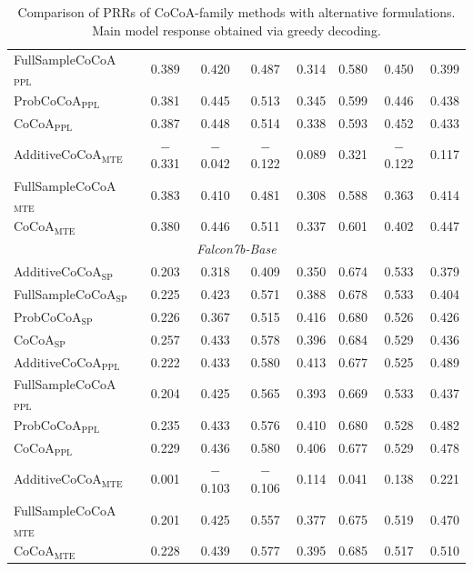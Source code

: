 \documentclass[11pt]{article}
\begin{document}
\begin{table}[htbp]
{\begin{tabular}{l ccccccc}
FullSampleCoCoA$_{\mathrm{PPL}}$ & 0.389 & 0.420 & 0.487 & 0.314 & 0.580 & 0.450 & 0.399 \\
ProbCoCoA$_{\mathrm{PPL}}$ & 0.381 & 0.445 & 0.513 & 0.345 & 0.599 & 0.446 & 0.438 \\
CoCoA$_{\mathrm{PPL}}$ & 0.387 & 0.448 & 0.514 & 0.338 & 0.593 & 0.452 & 0.433 \\
AdditiveCoCoA$_{\mathrm{MTE}}$ & $-$0.331 & $-$0.042 & $-$0.122 & 0.089 & 0.321 & $-$0.122 & 0.117 \\
FullSampleCoCoA$_{\mathrm{MTE}}$ & 0.383 & 0.410 & 0.481 & 0.308 & 0.588 & 0.363 & 0.414 \\
CoCoA$_{\mathrm{MTE}}$ & 0.380 & 0.446 & 0.511 & 0.337 & 0.601 & 0.402 & 0.447 \\
\midrule
\multicolumn{8}{c}{\textit{Falcon7b-Base}} \\
\midrule
AdditiveCoCoA$_{\mathrm{SP}}$ & 0.203 & 0.318 & 0.409 & 0.350 & 0.674 & 0.533 & 0.379 \\
FullSampleCoCoA$_{\mathrm{SP}}$ & 0.225 & 0.423 & 0.571 & 0.388 & 0.678 & 0.533 & 0.404 \\
ProbCoCoA$_{\mathrm{SP}}$ & 0.226 & 0.367 & 0.515 & 0.416 & 0.680 & 0.526 & 0.426 \\
CoCoA$_{\mathrm{SP}}$ & 0.257 & 0.433 & 0.578 & 0.396 & 0.684 & 0.529 & 0.436 \\
AdditiveCoCoA$_{\mathrm{PPL}}$ & 0.222 & 0.433 & 0.580 & 0.413 & 0.677 & 0.525 & 0.489 \\
FullSampleCoCoA$_{\mathrm{PPL}}$ & 0.204 & 0.425 & 0.565 & 0.393 & 0.669 & 0.533 & 0.437 \\
ProbCoCoA$_{\mathrm{PPL}}$ & 0.235 & 0.433 & 0.576 & 0.410 & 0.680 & 0.528 & 0.482 \\
CoCoA$_{\mathrm{PPL}}$ & 0.229 & 0.436 & 0.580 & 0.406 & 0.677 & 0.529 & 0.478 \\
AdditiveCoCoA$_{\mathrm{MTE}}$ & 0.001 & $-$0.103 & $-$0.106 & 0.114 & 0.041 & 0.138 & 0.221 \\
FullSampleCoCoA$_{\mathrm{MTE}}$ & 0.201 & 0.425 & 0.557 & 0.377 & 0.675 & 0.519 & 0.470 \\
CoCoA$_{\mathrm{MTE}}$ & 0.228 & 0.439 & 0.577 & 0.395 & 0.685 & 0.517 & 0.510 \\
\bottomrule
\end{tabular}%
}
\caption{Comparison of PRRs of CoCoA-family methods with alternative formulations. Main model response obtained via greedy decoding.}
\label{tab:cocoa_table8}
\end{table}
\end{document}

